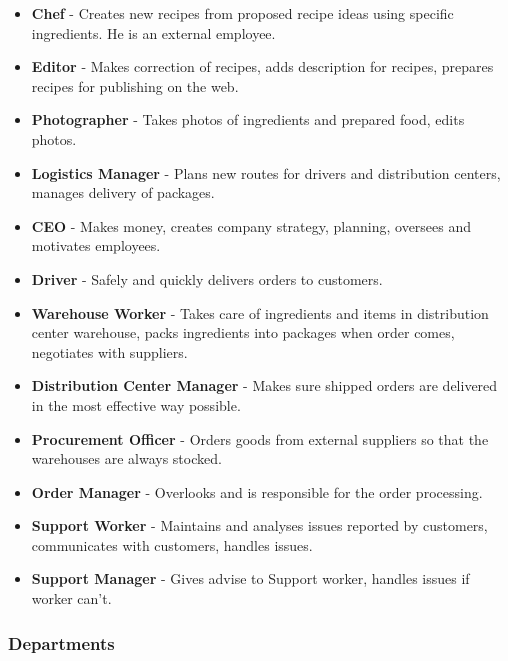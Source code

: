 \documentclass[11pt,a4paper]{article}
\begin{document}
\begin{itemize}
    \item \textbf{Chef} - Creates new recipes from proposed recipe ideas using specific ingredients. He is an external employee.
    \item \textbf{Editor} - Makes correction of recipes, adds description for recipes, prepares recipes for publishing on the web.
    \item \textbf{Photographer} - Takes photos of ingredients and prepared food, edits photos.
    \item \textbf{Logistics Manager} - Plans new routes for drivers and distribution centers, manages delivery of packages.
    \item \textbf{CEO} - Makes money, creates company strategy, planning, oversees and motivates employees.
    \item \textbf{Driver} - Safely and quickly delivers orders to customers.
    \item \textbf{Warehouse Worker} - Takes care of ingredients and items in distribution center warehouse, packs ingredients into packages when order comes, negotiates with suppliers.
    \item \textbf{Distribution Center Manager} - Makes sure shipped orders are delivered in the most effective way possible.
    \item \textbf{Procurement Officer} - Orders goods from external suppliers so that the warehouses are always stocked.
    \item \textbf{Order Manager} - Overlooks and is responsible for the order processing.
    \item \textbf{Support Worker} - Maintains and analyses issues reported by customers, communicates with customers, handles issues.
    \item \textbf{Support Manager} - Gives advise to Support worker, handles issues if worker can't.
\end{itemize}

\subsubsection{Departments}
\end{document}
